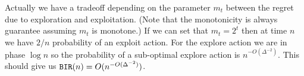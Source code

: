 \begin{remark}
Actually we have a tradeoff depending on the parameter $m_t$ between
the regret due to exploration and exploitation. (Note that the
monotonicity is always guarantee assuming $m_t$ is monotone.) If we
can set that $m_t = 2^t$ then at time $n$ we have $2/ n$ probability
of an exploit action. For the explore action we are in phase $\log
n$ so the probability of a sub-optimal explore action is
$n^{-O(\Delta^{-2})}$. This should give us
$\mathtt{BIR}(n)=O(n^{-O(\Delta^{-2})})$.
\end{remark}


%


%
%
%
%
%


